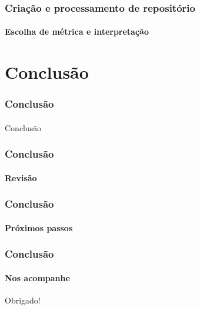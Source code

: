 \documentclass{beamer}
\begin{document}
  \begin{frame}
    \frametitle{Criação e processamento de repositório}
    \framesubtitle{Escolha de métrica e interpretação}
  \end{frame}

\section{Conclusão}
\begin{frame}
  \frametitle{Conclusão}
  \framesubtitle{}

  Conclusão
\end{frame}

\begin{frame}
  \frametitle{Conclusão}
  \framesubtitle{Revisão}
\end{frame}

\begin{frame}
  \frametitle{Conclusão}
  \framesubtitle{Próximos passos}
\end{frame}

\begin{frame}
  \frametitle{Conclusão}
  \framesubtitle{Nos acompanhe}

  Obrigado!
\end{frame}
\end{document}
